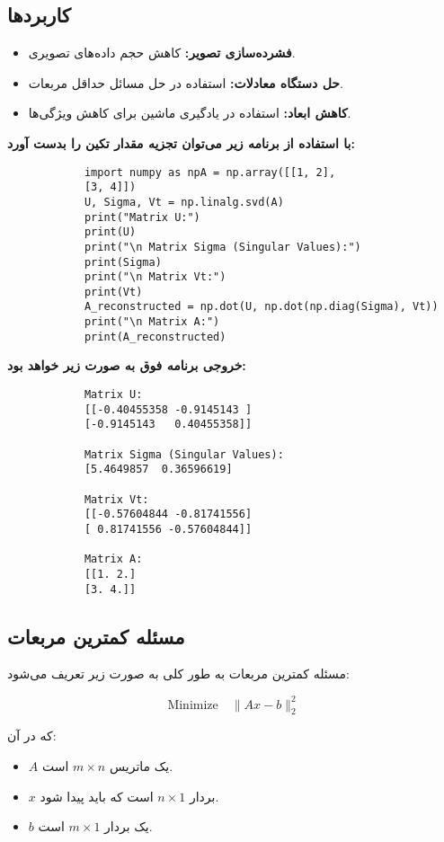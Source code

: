 \subsection{کاربردها}
\begin{itemize}
	\item \textbf{فشرده‌سازی تصویر:} کاهش حجم داده‌های تصویری.
	\item \textbf{حل دستگاه معادلات:} استفاده در حل مسائل حداقل مربعات.
	\item \textbf{کاهش ابعاد:} استفاده در یادگیری ماشین برای کاهش ویژگی‌ها.
\end{itemize}
\textbf{با استفاده از برنامه زیر می‌توان تجزیه مقدار تکین را بدست آورد:}
\begin{code}
	\begin{latin}
		\begin{lstlisting}
			import numpy as npA = np.array([[1, 2], 
			[3, 4]])
			U, Sigma, Vt = np.linalg.svd(A)
			print("Matrix U:")
			print(U)
			print("\n Matrix Sigma (Singular Values):")
			print(Sigma)
			print("\n Matrix Vt:")
			print(Vt)
			A_reconstructed = np.dot(U, np.dot(np.diag(Sigma), Vt))
			print("\n Matrix A:")
			print(A_reconstructed)
		\end{lstlisting}
	\end{latin}
\end{code}
\textbf{خروجی برنامه فوق به صورت زیر خواهد بود:}
\begin{code}
	\begin{latin}
		\begin{lstlisting}
			Matrix U:
			[[-0.40455358 -0.9145143 ]
			[-0.9145143   0.40455358]]
			
			Matrix Sigma (Singular Values):
			[5.4649857  0.36596619]
			
			Matrix Vt:
			[[-0.57604844 -0.81741556]
			[ 0.81741556 -0.57604844]]
			
			Matrix A:
			[[1. 2.]
			[3. 4.]]
		\end{lstlisting}
	\end{latin}
\end{code}
\subsection{مسئله کمترین مربعات}

مسئله کمترین مربعات به طور کلی به صورت زیر تعریف می‌شود:

\[
\text{Minimize} \quad \|Ax - b\|_2^2
\]

که در آن:

\begin{itemize}
	\item \(A\) یک ماتریس \(m \times n\) است.
	\item \(x\) بردار \(n \times 1\) است که باید پیدا شود.
	\item \(b\) یک بردار \(m \times 1\) است.
\end{itemize}

